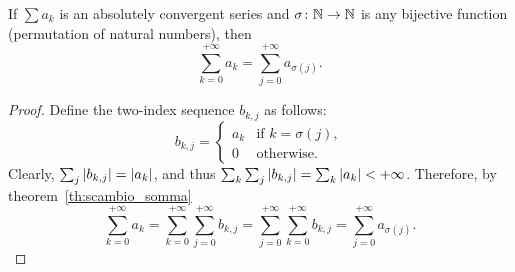 \begin{theorem}%
\label{th:convergenza_incondizionata}%
\mymark{*}%
%
If $\sum a_k$ is an absolutely convergent series and $\sigma\colon {\mathbb N} \to {\mathbb N}$
is any bijective function (permutation of natural numbers), then
\[
  \sum_{k=0}^{+\infty} a_k
  = \sum_{j=0}^{+\infty} a_{\sigma(j)}.
\]
\end{theorem}
\begin{proof}
Define the two-index sequence $b_{k,j}$ as follows:
\[
  b_{k,j} = \begin{cases}
    a_k & \text{if $k=\sigma(j)$},\\
    0 & \text{otherwise}.
  \end{cases}  
\] 
Clearly, $\sum_j {\left|b_{k,j}\right|} = {\left|a_k\right|}$, and thus $\sum_k \sum_j
{\left|b_{k,j}\right|} = \sum_k {\left|a_k\right|} < +\infty$. Therefore, by
theorem~\ref{th:scambio_somma}
\[
 \sum_{k=0}^{+\infty} a_k 
 = \sum_{k=0}^{+\infty} \sum_{j=0}^{+\infty}b_{k,j}
 = \sum_{j=0}^{+\infty} \sum_{k=0}^{+\infty}b_{k,j}
 = \sum_{j=0}^{+\infty} a_{\sigma(j)}.  
\]
\end{proof}

